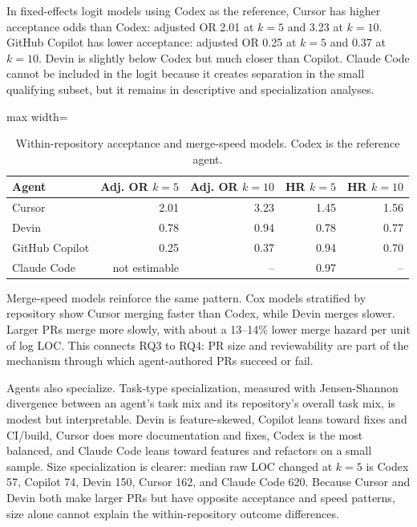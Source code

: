 \documentclass[sigconf,nonacm]{acmart}
\begin{document}
In fixed-effects logit models using Codex as the reference, Cursor has higher acceptance odds than Codex: adjusted OR 2.01 at $k=5$ and 3.23 at $k=10$. GitHub Copilot has lower acceptance: adjusted OR 0.25 at $k=5$ and 0.37 at $k=10$. Devin is slightly below Codex but much closer than Copilot. Claude Code cannot be included in the logit because it creates separation in the small qualifying subset, but it remains in descriptive and specialization analyses.

\begin{table}[!htbp]
\caption{Within-repository acceptance and merge-speed models. Codex is the reference agent.}
\label{tab:rq3-models}
\centering
\scriptsize
\begin{adjustbox}{max width=\linewidth}
\begin{tabular}{lrrrr}
\toprule
Agent & Adj. OR $k=5$ & Adj. OR $k=10$ & HR $k=5$ & HR $k=10$ \\
\midrule
Cursor & 2.01 & 3.23 & 1.45 & 1.56 \\
Devin & 0.78 & 0.94 & 0.78 & 0.77 \\
GitHub Copilot & 0.25 & 0.37 & 0.94 & 0.70 \\
Claude Code & not estimable & -- & 0.97 & -- \\
\bottomrule
\end{tabular}
\end{adjustbox}
\end{table}

Merge-speed models reinforce the same pattern. Cox models stratified by repository show Cursor merging faster than Codex, while Devin merges slower. Larger PRs merge more slowly, with about a 13--14\% lower merge hazard per unit of log LOC. This connects RQ3 to RQ4: PR size and reviewability are part of the mechanism through which agent-authored PRs succeed or fail.

Agents also specialize. Task-type specialization, measured with Jensen-Shannon divergence between an agent's task mix and its repository's overall task mix, is modest but interpretable. Devin is feature-skewed, Copilot leans toward fixes and CI/build, Cursor does more documentation and fixes, Codex is the most balanced, and Claude Code leans toward features and refactors on a small sample. Size specialization is clearer: median raw LOC changed at $k=5$ is Codex 57, Copilot 74, Devin 150, Cursor 162, and Claude Code 620. Because Cursor and Devin both make larger PRs but have opposite acceptance and speed patterns, size alone cannot explain the within-repository outcome differences.
\end{document}
